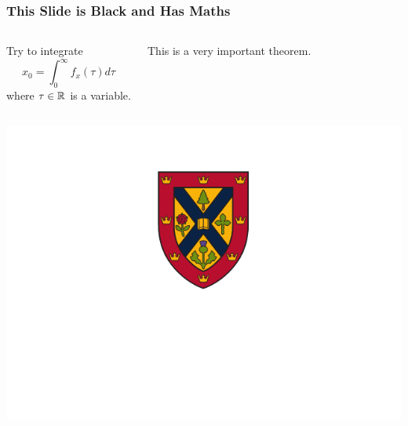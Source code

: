 \documentclass[fleqn]{qu-slides}
\begin{document}



\SlideBlack
\begin{frame}
    \frametitle{This Slide is Black and Has Maths}
    \begin{columns}
        Try to integrate
        \begin{equation}
            x_0=\int_0^\infty f_x(\tau)d\tau
        \end{equation}
        where $\tau\in\mathbb R$ is a variable.
        \begin{thm}
            This is a very important theorem.
        \end{thm}
    \end{columns}
\end{frame}


\SlideBlue 
\begin{frame}
    \centering
    \includegraphics[height=0.9\textheight]{logo/qu-logo-vertical-reverse.pdf}
\end{frame}

\end{document}
